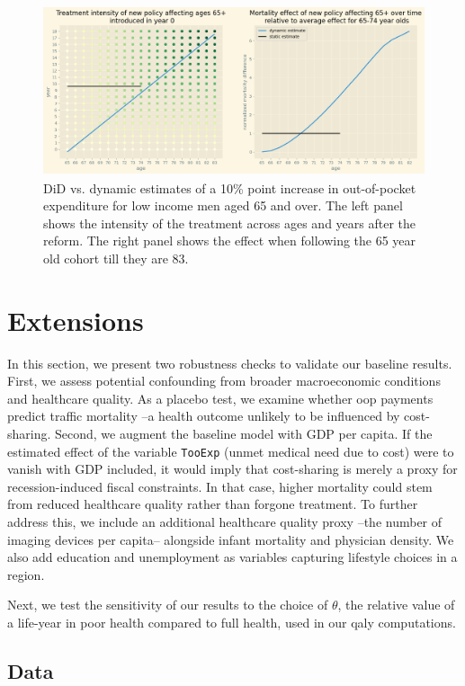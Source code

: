\documentclass[a4paper,12pt]{article}
\begin{document}
\begin{figure}[htbp]
\centering
\includegraphics[height=5cm]{./figures/years_treatment.png}
\caption{\label{fig:years_treatment}DiD vs. dynamic estimates of a 10\% point increase in out-of-pocket expenditure for low income men aged 65 and over. The left panel shows the intensity of the treatment across ages and years after the reform. The right panel shows the effect when following the 65 year old cohort till they are 83.}
\end{figure}
\section{Extensions}
\label{sec:org2bec0ad}

In this section, we present two robustness checks to validate our baseline results. First, we assess potential confounding from broader macroeconomic conditions and healthcare quality. As a placebo test, we examine whether oop payments predict traffic mortality --a health outcome unlikely to be influenced by cost-sharing. Second, we augment the baseline model with GDP per capita. If the estimated effect of the variable \texttt{TooExp} (unmet medical need due to cost) were to vanish with GDP included, it would imply that cost-sharing is merely a proxy for recession-induced fiscal constraints. In that case, higher mortality could stem from reduced healthcare quality rather than forgone treatment. To further address this, we include an additional healthcare quality proxy --the number of imaging devices per capita-- alongside infant mortality and physician density. We also add education and unemployment as variables capturing lifestyle choices in a region.

Next, we test the sensitivity of our results to the choice of \(\theta\), the relative value of a life-year in poor health compared to full health, used in our qaly computations.
\subsection{Data}
\label{sec:org9abdbac}
\end{document}
